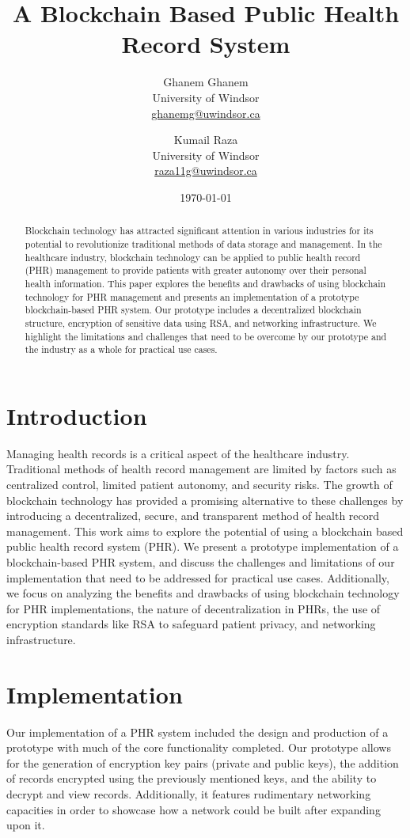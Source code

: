 \documentclass{article}
\title{A Blockchain Based Public Health Record System}
\author{
    \begin{tabular}{c}
        Ghanem Ghanem \\
        \small University of Windsor \\
        \small \href{mailto:ghanemg@uwindsor.ca}{ghanemg@uwindsor.ca}
    \end{tabular}
    \and 
    \begin{tabular}{c}
        Kumail Raza \\
        \small University of Windsor \\
        \small \href{mailto:raza11g@uwindsor.ca}{raza11g@uwindsor.ca}
    \end{tabular}
}
\date{\today}
\begin{document}
\maketitle

\begin{abstract}
Blockchain technology has attracted significant attention in various industries for its potential to revolutionize traditional methods of data storage and management. In the healthcare industry, blockchain technology can be applied to public health record (PHR) management to provide patients with greater autonomy over their personal health information. This paper explores the benefits and drawbacks of using blockchain technology for PHR management and presents an implementation of a prototype blockchain-based PHR system. Our prototype includes a decentralized blockchain structure, encryption of sensitive data using RSA, and networking infrastructure. We highlight the limitations and challenges that need to be overcome by our prototype and the industry as a whole for practical use cases.
\end{abstract}

\section{Introduction}
Managing health records is a critical aspect of the healthcare industry. Traditional methods of health record management are limited by factors such as centralized control, limited patient autonomy, and security risks. The growth of blockchain technology has provided a promising alternative to these challenges by introducing a decentralized, secure, and transparent method of health record management. This work aims to explore the potential of using a blockchain based public health record system (PHR). We present a prototype implementation of a blockchain-based PHR system, and discuss the challenges and limitations of our implementation that need to be addressed for practical use cases. Additionally, we focus on analyzing the benefits and drawbacks of using blockchain technology for PHR implementations, the nature of decentralization in PHRs, the use of encryption standards like RSA to safeguard patient privacy, and networking infrastructure.

\section{Implementation}
Our implementation of a PHR system included the design and production of a prototype with much of the core functionality completed. Our prototype allows for the generation of encryption key pairs (private and public keys), the addition of records encrypted using the previously mentioned keys, and the ability to decrypt and view records. Additionally, it features rudimentary networking capacities in order to showcase how a network could be built after expanding upon it.
\end{document}
